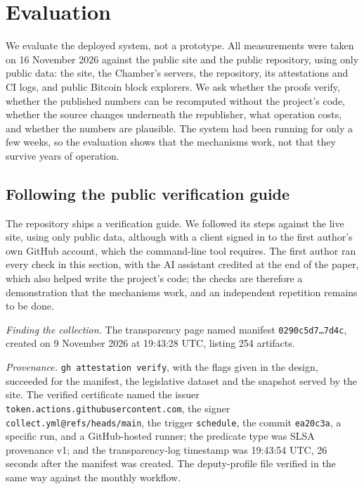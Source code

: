 \section{Evaluation}
\label{sec:eval}

We evaluate the deployed system, not a prototype. All measurements were taken on 16 November 2026 against the public site and the public repository, using only public data: the site, the Chamber's servers, the repository, its attestations and CI logs, and public Bitcoin block explorers. We ask whether the proofs verify, whether the published numbers can be recomputed without the project's code, whether the source changes underneath the republisher, what operation costs, and whether the numbers are plausible. The system had been running for only a few weeks, so the evaluation shows that the mechanisms work, not that they survive years of operation.

\subsection{Following the public verification guide}
\label{sec:eval-verify}

The repository ships a verification guide. We followed its steps against the live site, using only public data, although with a client signed in to the first author's own GitHub account, which the command-line tool requires. The first author ran every check in this section, with the AI assistant credited at the end of the paper, which also helped write the project's code; the checks are therefore a demonstration that the mechanisms work, and an independent repetition remains to be done.

\emph{Finding the collection.} The transparency page named manifest \texttt{0290c5d7\ldots7d4c}, created on 9 November 2026 at 19:43:28 UTC, listing 254 artifacts.

\emph{Provenance.} \texttt{gh attestation verify}, with the flags given in the design, succeeded for the manifest, the legislative dataset and the snapshot served by the site. The verified certificate named the issuer \texttt{token.actions.githubusercontent.com}, the signer \texttt{collect.yml@refs/heads/main}, the trigger \texttt{schedule}, the commit \texttt{ea20c3a}, a specific run, and a GitHub-hosted runner; the predicate type was SLSA provenance v1; and the transparency-log timestamp was 19:43:54 UTC, 26 seconds after the manifest was created. The deputy-profile file verified in the same way against the monthly workflow.

